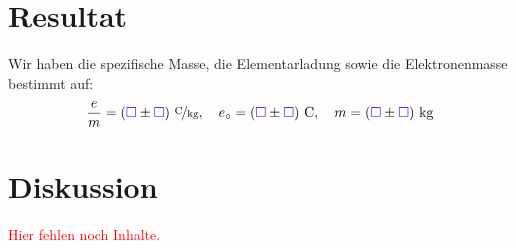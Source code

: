 \documentclass[11pt]{article}
\newcommand{\emesswert}{\left(\messwert \pm \messwert \right)}
\newcommand{\fehlt}{\textcolor{red}{Hier fehlen noch Inhalte.}}
\newcommand{\messwert}{\textcolor{blue}{\square}}
\begin{document}
\section{Resultat}

Wir haben die spezifische Masse, die Elementarladung sowie die Elektronenmasse
bestimmt auf:
\[
	\frac em = \unitfrac[\emesswert]C{kg}
	, \quad
	e_\circ = \unit[\emesswert]C
	, \quad
	m = \unit[\emesswert]{kg}
\]



\section{Diskussion}

\fehlt
\end{document}
